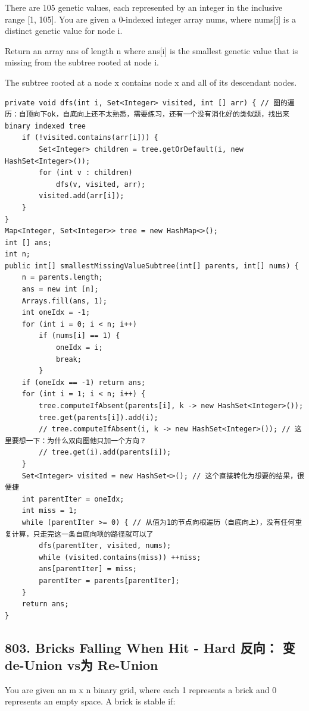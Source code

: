 \documentclass[9pt, b5paaper]{book}
\begin{document}
There are 105 genetic values, each represented by an integer in the inclusive range [1, 105]. You are given a 0-indexed integer array nums, where nums[i] is a distinct genetic value for node i.

Return an array ans of length n where ans[i] is the smallest genetic value that is missing from the subtree rooted at node i.

The subtree rooted at a node x contains node x and all of its descendant nodes.
\begin{verbatim}
private void dfs(int i, Set<Integer> visited, int [] arr) { // 图的遍历：自顶向下ok，自底向上还不太熟悉，需要练习，还有一个没有消化好的类似题，找出来binary indexed tree
    if (!visited.contains(arr[i])) {
        Set<Integer> children = tree.getOrDefault(i, new HashSet<Integer>());
        for (int v : children) 
            dfs(v, visited, arr);
        visited.add(arr[i]);
    }
}
Map<Integer, Set<Integer>> tree = new HashMap<>();
int [] ans;
int n;
public int[] smallestMissingValueSubtree(int[] parents, int[] nums) {
    n = parents.length;
    ans = new int [n];
    Arrays.fill(ans, 1); 
    int oneIdx = -1;
    for (int i = 0; i < n; i++) 
        if (nums[i] == 1) {
            oneIdx = i;
            break;
        }
    if (oneIdx == -1) return ans;
    for (int i = 1; i < n; i++) {
        tree.computeIfAbsent(parents[i], k -> new HashSet<Integer>());
        tree.get(parents[i]).add(i);
        // tree.computeIfAbsent(i, k -> new HashSet<Integer>()); // 这里要想一下：为什么双向图他只加一个方向？
        // tree.get(i).add(parents[i]);
    }
    Set<Integer> visited = new HashSet<>(); // 这个直接转化为想要的结果，很便捷
    int parentIter = oneIdx;
    int miss = 1;
    while (parentIter >= 0) { // 从值为1的节点向根遍历（自底向上），没有任何重复计算，只走完这一条自底向项的路径就可以了
        dfs(parentIter, visited, nums);
        while (visited.contains(miss)) ++miss;
        ans[parentIter] = miss;
        parentIter = parents[parentIter];
    }
    return ans;
}
\end{verbatim}

\subsection{803. Bricks Falling When Hit - Hard 反向： 变de-Union vs为 Re-Union}
\label{sec-10-0-3}
You are given an m x n binary grid, where each 1 represents a brick and 0 represents an empty space. A brick is stable if:
\end{document}
